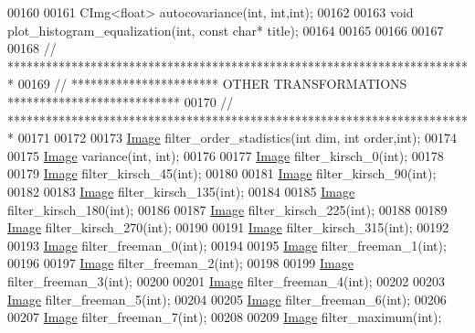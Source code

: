 \begin{DoxyCode}
00160 
00161     CImg<float> autocovariance(\textcolor{keywordtype}{int}, \textcolor{keywordtype}{int},\textcolor{keywordtype}{int});
00162 
00163     \textcolor{keywordtype}{void} plot\_histogram\_equalization(\textcolor{keywordtype}{int}, \textcolor{keyword}{const} \textcolor{keywordtype}{char}* title); 
00164 
00165 
00166     
00167 
00168 \textcolor{comment}{// *************************************************************************}
00169 \textcolor{comment}{// *********************** OTHER TRANSFORMATIONS ***************************}
00170 \textcolor{comment}{// *************************************************************************}
00171 
00172 
00173     \hyperlink{class_image}{Image} filter\_order\_stadistics(\textcolor{keywordtype}{int} dim, \textcolor{keywordtype}{int} order,\textcolor{keywordtype}{int}); 
00174 
00175     \hyperlink{class_image}{Image} variance(\textcolor{keywordtype}{int}, \textcolor{keywordtype}{int}); 
00176     
00177     \hyperlink{class_image}{Image} filter\_kirsch\_0(\textcolor{keywordtype}{int}); 
00178     
00179     \hyperlink{class_image}{Image} filter\_kirsch\_45(\textcolor{keywordtype}{int});
00180     
00181     \hyperlink{class_image}{Image} filter\_kirsch\_90(\textcolor{keywordtype}{int});
00182     
00183     \hyperlink{class_image}{Image} filter\_kirsch\_135(\textcolor{keywordtype}{int});
00184     
00185     \hyperlink{class_image}{Image} filter\_kirsch\_180(\textcolor{keywordtype}{int});
00186     
00187     \hyperlink{class_image}{Image} filter\_kirsch\_225(\textcolor{keywordtype}{int});
00188     
00189     \hyperlink{class_image}{Image} filter\_kirsch\_270(\textcolor{keywordtype}{int});
00190     
00191     \hyperlink{class_image}{Image} filter\_kirsch\_315(\textcolor{keywordtype}{int});
00192     
00193     \hyperlink{class_image}{Image} filter\_freeman\_0(\textcolor{keywordtype}{int});
00194     
00195     \hyperlink{class_image}{Image} filter\_freeman\_1(\textcolor{keywordtype}{int});
00196     
00197     \hyperlink{class_image}{Image} filter\_freeman\_2(\textcolor{keywordtype}{int});
00198     
00199     \hyperlink{class_image}{Image} filter\_freeman\_3(\textcolor{keywordtype}{int});
00200     
00201     \hyperlink{class_image}{Image} filter\_freeman\_4(\textcolor{keywordtype}{int});
00202     
00203     \hyperlink{class_image}{Image} filter\_freeman\_5(\textcolor{keywordtype}{int});
00204     
00205     \hyperlink{class_image}{Image} filter\_freeman\_6(\textcolor{keywordtype}{int});
00206     
00207     \hyperlink{class_image}{Image} filter\_freeman\_7(\textcolor{keywordtype}{int});
00208 
00209     \hyperlink{class_image}{Image} filter\_maximum(\textcolor{keywordtype}{int});

\end{DoxyCode}
